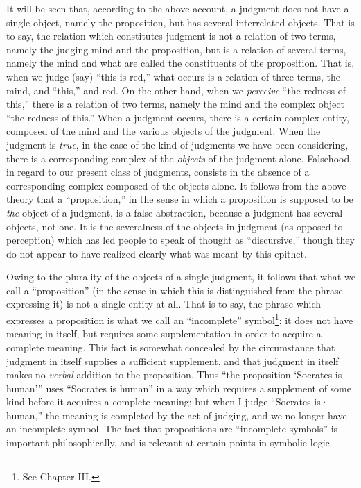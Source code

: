 \documentclass[letterpaper,12pt,openany,leqno]{book}
\newcommand{\pagefirst}[1]{\marginnote[\boxed{\text{#1}}]{\boxed{\text{#1}}}}
\begin{document}
It will be seen that, according to the above account, a judgment does not have a single object, namely the proposition, but has several interrelated objects. That is to say, the relation which constitutes judgment is not a relation of two terms, namely the judging mind and the proposition, but is a relation of several terms, namely the mind and what are called the constituents of the proposition. That is, when we judge (say) ``this is red,'' what occurs is a relation of three terms, the mind, and ``this,'' and red. On the other hand, when we \textit{perceive} ``the redness of this,'' there is a relation of two terms, namely the mind and the complex object ``the redness of this.'' When a judgment occurs, there is a certain complex entity, composed of the mind and the various objects of the judgment. When the judgment is \textit{true}, in the case of the kind of judgments we have been considering, there is a corresponding complex of the \textit{objects} of the judgment alone. Falsehood, in regard to our present class of judgments, consists in the absence of a corresponding complex composed of the objects alone. It follows from the above theory that a ``proposition,'' in the sense in which a proposition is supposed to be \textit{the} object of a judgment, is a false abstraction, because a judgment has several objects, not one. It is the severalness of the objects in judgment (as opposed to perception) which has led people to speak of thought as ``discursive,'' though they do not appear to have realized clearly what was meant by this epithet.

Owing to the plurality of the objects of a single judgment, it follows that what we call a ``proposition'' (in the sense in which this is distinguished from the phrase expressing it) is not a single entity at all. That is to say, the phrase which expresses a proposition is what we call an ``incomplete'' symbol\footnote{See Chapter III.}; it does not have meaning in itself, but requires some supplementation in order to acquire a complete meaning. This fact is somewhat concealed by the circumstance that judgment in itself supplies a sufficient supplement, and that judgment in itself makes no \textit{verbal} addition to the proposition. Thus ``the proposition `Socrates is human''' uses ``Socrates is human'' in a way which requires a supplement of some kind before it acquires a complete meaning; but when I judge ``Socrates is· human,'' the meaning is completed by the act of judging, and we no longer have an incomplete symbol. The fact that propositions are ``incomplete symbols'' \pagefirst{47} is important philosophically, and is relevant at certain points in symbolic logic.
\end{document}
